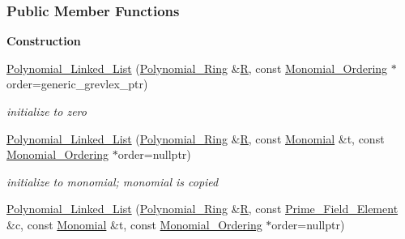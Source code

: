 \subsubsection*{Public Member Functions}
\begin{Indent}\textbf{ Construction}\par
\begin{DoxyCompactItemize}
\item 
\mbox{\label{group__polygroup_a251f514b92748997c7b66abb171196cd}} 
\hyperlink{group__polygroup_a251f514b92748997c7b66abb171196cd}{Polynomial\+\_\+\+Linked\+\_\+\+List} (\hyperlink{group__polygroup_class_polynomial___ring}{Polynomial\+\_\+\+Ring} \&\hyperlink{group__polygroup_a551ade20b7dcd96c227dd0401f6ffbbe}{R}, const \hyperlink{group__orderinggroup_class_monomial___ordering}{Monomial\+\_\+\+Ordering} $\ast$order=generic\+\_\+grevlex\+\_\+ptr)
\begin{DoxyCompactList}\small\item\em initialize to zero \end{DoxyCompactList}\item 
\mbox{\label{group__polygroup_a801c742fedba1aa99a0181d12d349cba}} 
\hyperlink{group__polygroup_a801c742fedba1aa99a0181d12d349cba}{Polynomial\+\_\+\+Linked\+\_\+\+List} (\hyperlink{group__polygroup_class_polynomial___ring}{Polynomial\+\_\+\+Ring} \&\hyperlink{group__polygroup_a551ade20b7dcd96c227dd0401f6ffbbe}{R}, const \hyperlink{group__polygroup_class_monomial}{Monomial} \&t, const \hyperlink{group__orderinggroup_class_monomial___ordering}{Monomial\+\_\+\+Ordering} $\ast$order=nullptr)
\begin{DoxyCompactList}\small\item\em initialize to monomial; monomial is copied \end{DoxyCompactList}\item 
\mbox{\label{group__polygroup_a85e7e2a93687e95f706d02d462b46fc6}} 
\hyperlink{group__polygroup_a85e7e2a93687e95f706d02d462b46fc6}{Polynomial\+\_\+\+Linked\+\_\+\+List} (\hyperlink{group__polygroup_class_polynomial___ring}{Polynomial\+\_\+\+Ring} \&\hyperlink{group__polygroup_a551ade20b7dcd96c227dd0401f6ffbbe}{R}, const \hyperlink{group___fields_group_class_prime___field___element}{Prime\+\_\+\+Field\+\_\+\+Element} \&c, const \hyperlink{group__polygroup_class_monomial}{Monomial} \&t, const \hyperlink{group__orderinggroup_class_monomial___ordering}{Monomial\+\_\+\+Ordering} $\ast$order=nullptr)

\end{DoxyCompactItemize}
\end{Indent}
